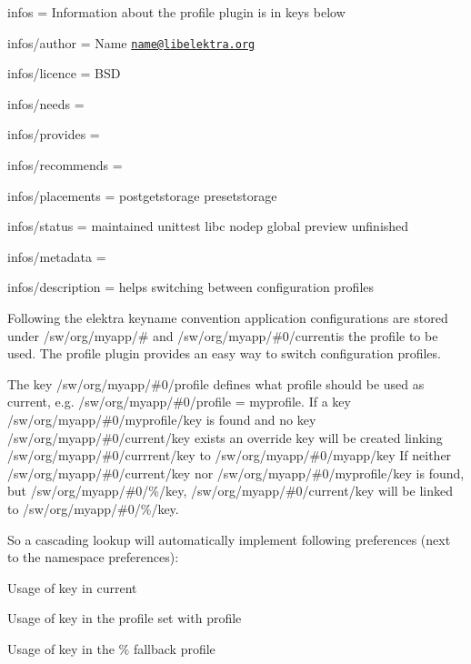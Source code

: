 
\begin{DoxyItemize}
\item infos = Information about the profile plugin is in keys below
\item infos/author = Name \href{mailto:name@libelektra.org}{\tt name@libelektra.\+org}
\item infos/licence = B\+S\+D
\item infos/needs =
\item infos/provides =
\item infos/recommends =
\item infos/placements = postgetstorage presetstorage
\item infos/status = maintained unittest libc nodep global preview unfinished
\item infos/metadata =
\item infos/description = helps switching between configuration profiles
\end{DoxyItemize}

Following the elektra keyname convention application configurations are stored under {\ttfamily /sw/org/myapp/\#} and {\ttfamily /sw/org/myapp/\#0/current}is the profile to be used. The {\ttfamily profile} plugin provides an easy way to switch configuration profiles.

The key {\ttfamily /sw/org/myapp/\#0/profile} defines what profile should be used as {\ttfamily current}, e.\+g. {\ttfamily /sw/org/myapp/\#0/profile = myprofile}. If a key {\ttfamily /sw/org/myapp/\#0/myprofile/key} is found and no key {\ttfamily /sw/org/myapp/\#0/current/key} exists an override key will be created linking {\ttfamily /sw/org/myapp/\#0/currrent/key} to {\ttfamily /sw/org/myapp/\#0/myapp/key} If neither {\ttfamily /sw/org/myapp/\#0/current/key} nor {\ttfamily /sw/org/myapp/\#0/myprofile/key} is found, but {\ttfamily /sw/org/myapp/\#0/\%/key}, {\ttfamily /sw/org/myapp/\#0/current/key} will be linked to {\ttfamily /sw/org/myapp/\#0/\%/key}.

So a cascading lookup will automatically implement following preferences (next to the namespace preferences)\+:


\begin{DoxyEnumerate}
\item Usage of key in {\ttfamily current}
\item Usage of key in the profile set with {\ttfamily profile}
\item Usage of key in the {\ttfamily \%} fallback profile
\end{DoxyEnumerate}

